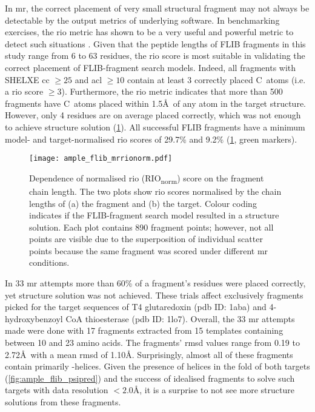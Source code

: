 In \gls{mr}, the correct placement of very small structural fragment may not always be detectable by the output metrics of underlying software. In benchmarking exercises, the \gls{rio} metric has shown to be a very useful and powerful metric to detect such situations \cite{Thomas2015-wu,Thomas2017-sh}. Given that the peptide lengths of FLIB fragments in this study range from 6 to 63 residues, the \gls{rio} score is most suitable in validating the correct placement of FLIB-fragment search models. Indeed, all fragments with SHELXE \gls{cc} $\geq25$ and \gls{acl} $\geq10$ contain at least 3 correctly placed C\textalpha\ atoms (i.e. a \gls{rio} score $\geq3$). Furthermore, the \gls{rio} metric indicates that more than 500 fragments have C\textalpha\ atoms placed within 1.5\AA\ of any atom in the target structure. However, only 4 residues are on average placed correctly, which was not enough to achieve structure solution (\cref{fig:ample_flib_mrrionorm}). All successful FLIB fragments have a minimum model- and target-normalised \gls{rio} scores of 29.7\% and 9.2\% (\cref{fig:ample_flib_mrrionorm}, green markers). 

\begin{figure}[H]
	\centering
	\texttt{[image: ample\_flib\_mrrionorm.pdf]}
	\caption[Relationship between fragment chain length and normalised RIO scores.]{Dependence of normalised \acrlong{rio} (RIO\textsubscript{norm}) score on the fragment chain length. The two plots show  \gls{rio} scores normalised by the chain lengths of (a) the fragment and (b) the target. Colour coding indicates if the FLIB-fragment search model resulted in a structure solution. Each plot contains 890 fragment points; however, not all points are visible due to the superposition of individual scatter points because the same fragment was scored under different \gls{mr} conditions.}
	\label{fig:ample_flib_mrrionorm}
\end{figure}

In 33 \gls{mr} attempts more than 60\% of a fragment's residues were placed correctly, yet structure solution was not achieved. These trials affect exclusively fragments picked for the target sequences of T4 glutaredoxin (\gls{pdb} ID: 1aba) and 4-hydroxybenzoyl CoA thioesterase (\gls{pdb} ID: 1lo7). Overall, the 33 \gls{mr} attempts made were done with 17 fragments extracted from 15 templates containing between 10 and 23 amino acids. The fragments' \gls{rmsd} values range from 0.19 to 2.72\AA\ with a mean \gls{rmsd} of 1.10\AA. Surprisingly, almost all of these fragments contain primarily \textalpha-helices. Given the presence of helices in the fold of both targets (\cref{fig:ample_flib_psipred}) and the success of idealised fragments to solve such targets with data resolution $<2.0$\AA, it is a surprise to not see more structure solutions from these fragments.

